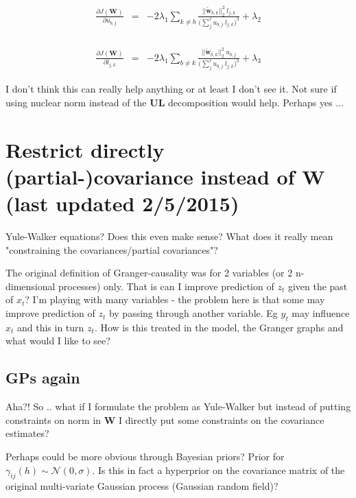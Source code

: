 \documentclass[a4paper]{article}
\newcommand{\vc}[1]{\mathbf{#1}}
\newif\ifShowComments
\newcommand{\todo}[1]{\ifShowComments {\color{red}\emph{Todo: #1}} \else {} \fi}
\begin{document}
\begin{eqnarray}
\frac{\partial\mathit{J}(\vc{W})}{\partial u_{b,j}} & = &
-2 \lambda_1 \sum_{k \neq b} \frac{||\tilde{\vc{w}}_{b,k}||_2^2 ~ l_{j,k}}{\big( \sum_j^r u_{b,j} ~ l_{j,k} \big)^3} + \lambda_2 \\
\end{eqnarray}

\begin{eqnarray}
\frac{\partial\mathit{J}(\vc{W})}{\partial l_{j,k}} & = &
-2 \lambda_1 \sum_{b \neq k} \frac{||\tilde{\vc{w}}_{b,k}||_2^2 ~ u_{b,j}}{\big( \sum_j^r u_{b,j} ~ l_{j,k} \big)^3} + \lambda_3
\end{eqnarray}

I don't think this can really help anything or at least I don't see it. Not sure if using nuclear norm instead of the $\vc{UL}$ decomposition would help. Perhaps yes ... \todo{Look at nuclear norm minimisation}

\section{Restrict directly (partial-)covariance instead of $\vc{W}$ (last updated 2/5/2015)}

Yule-Walker equations? Does this even make sense? What does it really mean "constraining the covariances/partial covariances"?

The original definition of Granger-causality was for 2 variables (or 2 n-dimensional processes) only. That is can I improve prediction of $z_t$ given the past of $x_t$?
I'm playing with many variables - the problem here is that some may improve prediction of $z_t$ by passing through another variable. Eg $y_t$ may influence $x_t$ and this in turn $z_t$. How is this treated in the model, the Granger graphs and what would I like to see?

\subsection{GPs again}

Aha?! So .. what if I formulate the problem as Yule-Walker but instead of putting constraints on norm in $\vc{W}$ I directly put some constraints on the covariance estimates?

Perhaps could be more obvious through Bayesian priors?
Prior for $\gamma_{ij}(h) \sim \mathcal{N}(0,\sigma)$. Is this in fact a hyperprior on the covariance matrix of the original multi-variate Gaussian process (Gaussian random field)?
\end{document}
